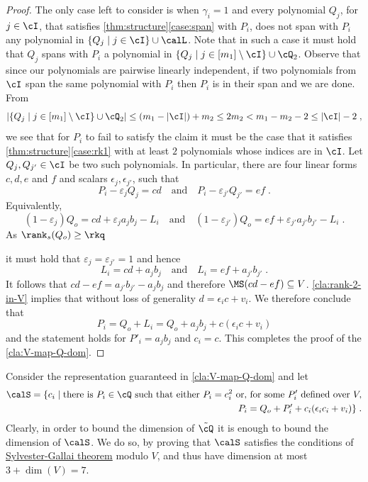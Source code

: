 \begin{proof}
The only case left to consider is when $\gamma_i =1$ and  every polynomial $Q_j$, for $j\in\cI$, that satisfies \autoref{thm:structure}\ref{case:span} with $P_i$, does not span with $P_i$ any polynomial in $\{Q_j \mid j\in  \cI\} \cup \calL$. Note that in such a case it must hold that $Q_j$ spans with $P_i$ a polynomial in $\{Q_j \mid j\in [m_1]\setminus  \cI\} \cup \cQ_2$. Observe that since our polynomials are pairwise linearly independent, if two polynomials from $\cI$ span the same polynomial with $P_i$ then $P_i$ is in their span and we are done. From 
$$\left|\{Q_j \mid j\in [m_1]\setminus  \cI\} \cup \cQ_2\right| \leq \left(m_1 - |\cI| \right) + m_2 \leq 2m_2 < m_1 -m_2 -2 \leq |\cI| -2 \;,$$
we see that for $P_i$ to fail to satisfy the claim it must be the case that 
it satisfies \autoref{thm:structure}\ref{case:rk1} with at least $2$ polynomials whose indices are in $\cI$. 
 Let $Q_j,Q_{j'} \in \cI$ be two such polynomials. In particular,  there are four linear forms $c,d,e$ and $f$ and scalars $\epsilon_j,\epsilon_{j'}$, such that
\begin{equation}\label{eq:P_i-twice-2}
P_i - \varepsilon_j Q_j = cd \quad \text{and} \quad P_i - \varepsilon_{j'} Q_{j'} = ef \;.
\end{equation} 
Equivalently, 
\begin{equation*}
(1- \varepsilon_j) Q_o = cd + \varepsilon_j a_jb_j - L_i  \quad \text{and} \quad (1- \varepsilon_{j'}) Q_o = ef + \varepsilon_{j'}a_{j'}b_{j'} - L_i \;.
\end{equation*} 
As $\rank_s(Q_o) \geq \rkq$ 

it must hold that $\varepsilon_j = \varepsilon_{j'} = 1$ and hence
\begin{equation*}
L_i = cd +   a_jb_j \quad \text{and} \quad 
L_i = ef + a_{j'}b_{j'} \;.
\end{equation*} 
It follows that  $cd -ef =   a_{j'}b_{j'}- a_{j}b_{j}$ and therefore $\MS(cd -ef) \subseteq V$. \autoref{cla:rank-2-in-V} implies that without loss of generality $d = \epsilon_i c + v_i$. We therefore conclude that $$P_i = Q_o + L_i = Q_o + a_jb_j + c( \epsilon_i c + v_i)$$ and the statement holds for $P'_i = a_jb_j$ and $c_i = c$.
This completes the proof of the \autoref{cla:V-map-Q-dom}.
\end{proof}

Consider the representation guaranteed in \autoref{cla:V-map-Q-dom} and let 
\[\begin{split}
\calS = \lbrace c_i \mid \text{there is } P_i\in\cQ \text{ such that either } P_i = c_i^2 \text{ or, for some } P'_i \text{ defined over } V, \\  P_i= Q_o +P'_i + c_i(\epsilon_i c_i + v_i)  \rbrace \;.
\end{split}\] 
Clearly, in order to bound the dimension of $\tilde{\cQ}$ it is enough to bound the dimension of $\calS$. We do so, by proving that $\calS$ satisfies the conditions of \hyperref[thm:SG-linforms]{Sylvester-Gallai theorem} modulo $V$, and thus have dimension at most $3+\dim(V)=7$.



